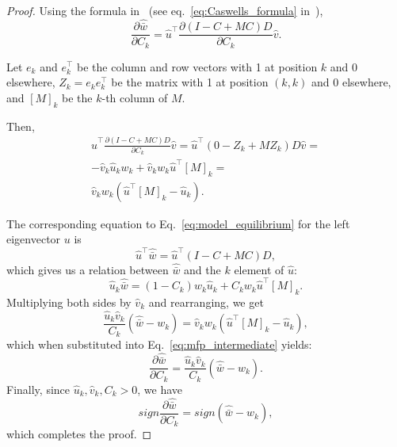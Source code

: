 \documentclass[9pt, a4paper, twocolumn]{extarticle}
\newcommand*{\tr}{^\intercal}
\begin{document}
\begin{proof}
Using the formula in~\citet{Caswell1978} (see eq.~\ref{eq:Caswells_formula} in~),
\begin{equation}
\frac{\partial \hat{\bar w}}{\partial C_k} = 
\hat u\tr \frac{\partial (I-C+MC)D}{\partial C_k} \hat v.
\end{equation}

Let $e_k$ and $e\tr_k$ be the column and row vectors with 1 at position $k$ and 0 elsewhere, $Z_k = e_k e\tr_k$ be the matrix with 1 at position $(k,k)$ and 0 elsewhere, and $[M]_k$ be the $k$-th column of $M$.

Then,
\begin{equation}\label{eq:mfp_intermediate}
\begin{aligned}
\hat u\tr \frac{\partial (I-C+MC)D}{\partial C_k} \hat v = 
\hat u\tr (0 - Z_k + M Z_k)D \hat v = \\
-\hat v_k \hat u_k w_k + \hat v_k w_k \hat u\tr[M]_k = \\
\hat v_k w_k (\hat u\tr[M]_k - \hat u_k). 
\end{aligned}
\end{equation}

The corresponding equation to Eq.~\ref{eq:model_equilibrium} for the left
eigenvector $u$ is 
\begin{equation}
\hat u\tr \hat{\bar w} = \hat u\tr (I - C + MC) D,
\end{equation}
which gives us a relation between $\hat{\bar w}$ and the $k$
element of $\hat u$:
\begin{equation}
\hat u_k \hat{\bar w} = (1-C_k) w_k \hat u_k + C_k w_k \hat u\tr [M]_k.
\end{equation}
Multiplying both sides by $\hat v_k$  and rearranging, we get 
\begin{equation}
\frac{\hat u_k \hat v_k}{C_k} (\hat{\bar w} - w_k) = \hat v_k w_k (\hat u\tr [M]_k - \hat u_k),
\end{equation}
which when substituted into Eq.~\ref{eq:mfp_intermediate} yields:
\begin{equation}
\frac{\partial \hat{\bar w}}{\partial C_k} = 
\frac{\hat u_k \hat v_k}{C_k} (\hat{\bar w} - w_k).
\end{equation}
Finally, since $\hat u_k, \hat v_k, C_k > 0$, we have
\begin{equation}
sign \frac{\partial \hat{\bar w}}{\partial C_k} = 
sign (\hat{\bar w} - w_k),
\end{equation}
which completes the proof.
\end{proof}
\end{document}
